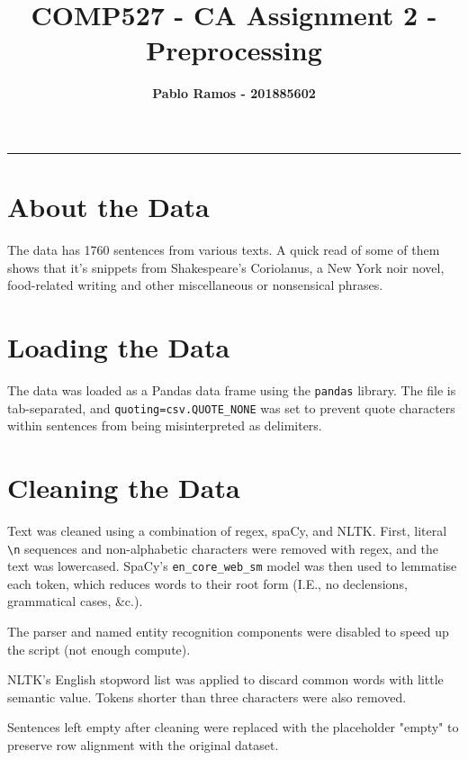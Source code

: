 \documentclass[11pt]{article}
\title{\textcolor{NavyBlue}{\textbf{COMP527 - CA Assignment 2 - Preprocessing}}}
\author{\textbf{Pablo Ramos - 201885602}}
\begin{document}
%
%
\maketitle
{\setlength\parindent{0mm} {\color{NavyBlue} \rule{\linewidth}{0.5mm}}} %
\section{About the Data}

The data has 1760 sentences from various texts. A quick read of some of them shows that it's snippets from Shakespeare's Coriolanus, a New York noir novel, food-related writing and other miscellaneous or nonsensical phrases.

\section{Loading the Data}

The data was loaded as a Pandas data frame using the \texttt{pandas} library. The file is tab-separated, and \texttt{quoting=csv.QUOTE\_NONE} was set to prevent quote characters within sentences from being misinterpreted as delimiters.

\section{Cleaning the Data}

Text was cleaned using a combination of regex, spaCy, and NLTK. First, literal \texttt{\textbackslash n} sequences and non-alphabetic characters were removed with regex, and the text was lowercased. SpaCy's \texttt{en\_core\_web\_sm} model was then used to lemmatise each token, which reduces words to their root form (I.E., no declensions, grammatical cases, \&c.). 

The parser and named entity recognition components were disabled to speed up the script (not enough compute).

NLTK's English stopword list was applied to discard common words with little semantic value. Tokens shorter than three characters were also removed. 

Sentences left empty after cleaning were replaced with the placeholder "empty" to preserve row alignment with the original dataset.
\end{document}
